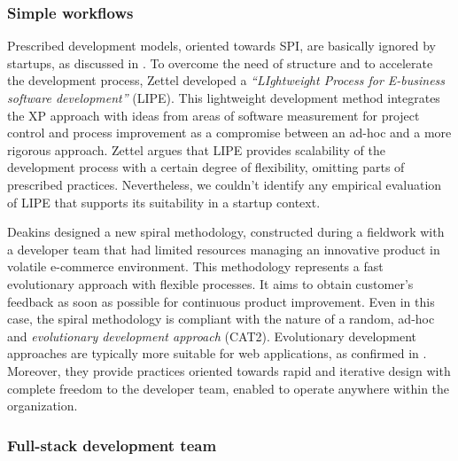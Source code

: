 \documentclass[10pt,journal,letterpaper,compsoc]{IEEEtran}
\begin{document}
\subsubsection{Simple workflows} Prescribed development models, oriented towards
SPI, are basically ignored by  startups, as discussed in \cite{Zettel2001}.
To overcome the need of structure and to accelerate the development process,  
Zettel developed a \textit{``LIghtweight Process for E-business software  
development''} (LIPE).
This lightweight development method integrates the XP  approach with ideas from
areas of software measurement for project control and  process improvement as a
compromise between an ad-hoc and a more rigorous  approach. Zettel argues that
LIPE provides scalability of the development  process with a certain degree of
flexibility, omitting parts of prescribed  practices. Nevertheless, we couldn't
identify any empirical evaluation of LIPE  that supports its suitability in a
startup context.


Deakins \cite{Deakins2005} designed a new spiral methodology, constructed
during a fieldwork with a developer team that had limited resources managing an
innovative product in volatile e-commerce environment. This methodology
represents a fast evolutionary approach with flexible processes.  It aims to
obtain customer's feedback as soon as possible for continuous  product
improvement.%
Even in this case, the spiral methodology%
is compliant with the nature of a random, ad-hoc and  \textit{evolutionary  
development approach} (CAT2). Evolutionary development approaches are  
typically more suitable for web applications, as confirmed in  
\cite{Deshpande2001}. Moreover, they provide practices oriented towards rapid 
and iterative design with complete freedom to the developer team, enabled to 
operate anywhere within the organization. 

\subsubsection{Full-stack development team}
\end{document}
